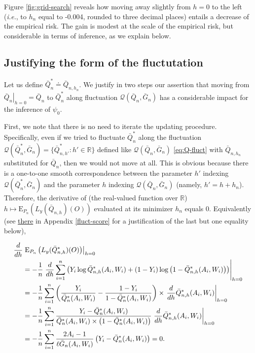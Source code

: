 \documentclass[11pt,openright,twoside]{book}
\newcommand{\bbR}{\mathbb{R}}
\newcommand{\defq}{\doteq}
\newcommand{\calQ}{\mathcal{Q}}
\newcommand{\Exp}{\textrm{E}}
\newcommand{\Gbar}{\bar{G}}
\newcommand{\Qbar}{\bar{Q}}
\theoremstyle{definition}
\theoremstyle{definition}
\theoremstyle{definition}
\theoremstyle{remark}
\begin{document}
Figure \ref{fig:grid-search} reveals how moving away slightly from \(h=0\) to
the left (\emph{i.e.}, to \(h_{n}\) equal to -0.004,
rounded to three decimal places) entails a decrease of the empirical risk. The
gain is modest at the scale of the empirical risk, but considerable in terms
of inference, as we explain below.

\hypertarget{fluct-justification}{%
\subsection{Justifying the form of the fluctutation}\label{fluct-justification}}

Let us define \(\Qbar_{n}^{*} \defq \Qbar_{n, h_{n}}\). We justify in two
steps our assertion that moving from \(\left.\Qbar_{n}\right|_{h=0} = \Qbar_{n}\) to \(\Qbar_{n}^{*}\) along fluctuation \(\calQ(\Qbar_{n}, \Gbar_{n})\)
has a considerable impact for the inference of \(\psi_{0}\).

First, we note that there is no need to iterate the updating procedure.
Specifically, even if we tried to fluctuate \(\Qbar_{n}^{*}\) along the
fluctuation \(\calQ(\Qbar_{n}^{*}, \Gbar_{n}) = \{\Qbar_{n,h'}^{*} : h' \in \bbR\}\) defined like \(\calQ(\Qbar_{n}, \Gbar_{n})\) \eqref{eq:Q-fluct} with
\(\Qbar_{n,h_{n}}\) substituted for \(\Qbar_{n}\), then we would not move at all.
This is obvious because there is a one-to-one smooth correspondence between
the parameter \(h'\) indexing \(\calQ(\Qbar_{n}^{*}, \Gbar_{n})\) and the
parameter \(h\) indexing \(\calQ(\Qbar_{n}, \Gbar_{n})\) (namely, \(h' = h + h_{n}\)). Therefore, the derivative of (the real-valued function over \(\bbR\))
\(h \mapsto \Exp_{P_n} \left(L_{y} (\Qbar_{n,h})(O)\right)\) evaluated at its
minimizer \(h_{n}\) equals 0. Equivalently (see \protect\hyperlink{fluct-score}{there} in
Appendix \ref{fluct-score} for a justification of the last but one equality
below),

\begin{align}\notag     \frac{d}{d      h}     &      \left.      \Exp_{P_{n}}
\left(L_{y}(\Qbar_{n,h}^{*})(O)\right)\right|_{h=0}      \\     \notag      &=
-\frac{1}{n}\left.\frac{d}{d     h}     \sum_{i=1}^{n}    \left(Y_{i}     \log
\Qbar_{n,h}^{*}(A_{i},    W_{i})    +    (1    -    Y_{i})    \log\left(1    -
\Qbar_{n,h}^{*}(A_{i}, W_{i})\right)\right)\right|_{h=0} \\ \notag &= -\frac{1}{n}\sum_{i=1}^{n} \left(\frac{Y_{i}}{\Qbar_{n}^{*}(A_{i}, W_{i})} - \frac{1 - Y_{i}}{1 - \Qbar_{n}^{*}(A_{i}, W_{i})}\right) \times \left.\frac{d}{d h} \Qbar_{n,h}^{*}(A_{i}, W_{i})\right|_{h=0} \\ \notag&= -\frac{1}{n}\sum_{i=1}^{n} \frac{Y_{i} - \Qbar_{n}^{*}(A_{i}, W_{i})}{\Qbar_{n}^{*}(A_{i}, W_{i}) \times \left(1 - \Qbar_{n}^{*}(A_{i}, W_{i})\right)} \left.\frac{d}{d h} \Qbar_{n,h}^{*}(A_{i}, W_{i})\right|_{h=0}  \\ &= -\frac{1}{n}\sum_{i=1}^{n} \frac{2A_{i} - 1}{\ell\Gbar_{n}(A_{i}, W_{i})} \left(Y_{i} - \Qbar_{n}^{*}(A_{i}, W_{i})\right) = 0. \label{eq:fluct-score}\end{align}
\end{document}
